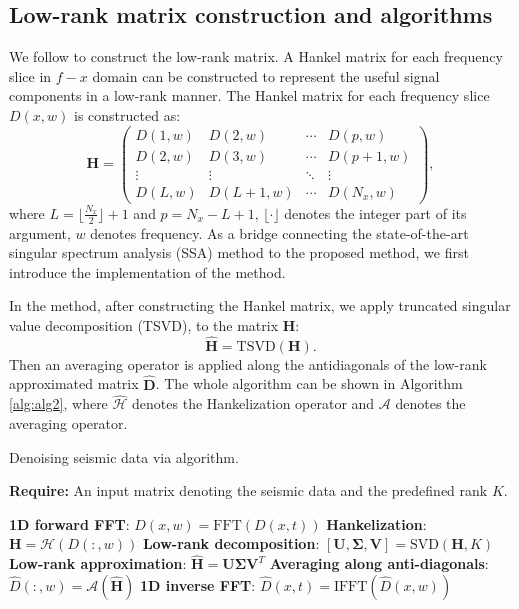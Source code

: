 \subsection{Low-rank matrix construction and algorithms}
We follow \cite{mssa} to construct the low-rank matrix. A Hankel matrix for each frequency slice in $f-x$ domain can be constructed to represent the useful signal components in a low-rank manner. The Hankel matrix for each frequency slice $D(x,w)$ is constructed as:
\begin{equation}
\label{eq:mssa}
\mathbf{H}=\left(\begin{array}{cccc}
D(1,w) & D(2,w) & \cdots &D(p,w) \\
D(2,w) & D(3,w)  &\cdots &D(p+1,w) \\
\vdots & \vdots &\ddots &\vdots \\
D(L,w)&D(L+1,w) &\cdots&D(N_x,w)
\end{array}
\right),
\end{equation}
where $L=\lfloor\frac{N_x}{2}\rfloor+1$ and $p=N_x-L+1$, $\lfloor \cdot \rfloor$ denotes the integer part of its argument, $w$ denotes frequency. As a bridge connecting the state-of-the-art singular spectrum analysis (SSA) method to the proposed method, we first introduce the implementation of the  method. 

In the  method, after constructing the Hankel matrix, we apply truncated singular value decomposition (TSVD), to the matrix $\mathbf{H}$:
\begin{equation}
\label{eq:tsvd}
\hat{\mathbf{H}}=\text{TSVD}\left(\mathbf{H}\right).
\end{equation}
 Then an averaging operator is applied along the antidiagonals of the low-rank approximated matrix $\hat{\mathbf{D}}$. The whole algorithm can be shown in Algorithm \ref{alg:alg2}, where $\hat{\mathcal{H}}$ denotes the Hankelization operator and $\mathcal{A}$ denotes the averaging operator.

  \begin{algorithm}
   \caption{Denoising seismic data via  algorithm. }
   \textbf{Require:} An input matrix denoting the seismic data and the predefined rank $K$.
    \begin{algorithmic}[1]
    \State \textbf{1D forward FFT}: $D(x,w)=\text{FFT}\left(D(x,t)\right)$
     \State \textbf{Hankelization}: $\mathbf{H}=\mathcal{H}(D(:,w))$
     \State \textbf{Low-rank decomposition}: $[\mathbf{U},\boldsymbol{\Sigma},\mathbf{V}]=\text{SVD}(\mathbf{H},K)$
     \State \textbf{Low-rank approximation}: $\hat{\mathbf{H}}=\mathbf{U}\boldsymbol{\Sigma}\mathbf{V}^T$
     \State \textbf{Averaging along anti-diagonals}: $\hat{D}(:,w)=\mathcal{A}(\hat{\mathbf{H}})$
        \EndFor 
         \State \textbf{1D inverse FFT}: $\hat{D}(x,t)=\text{IFFT}\left(\hat{D}(x,w)\right)$
\end{algorithmic}
\label{alg:alg2}
\end{algorithm}

